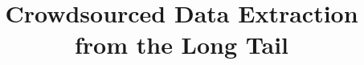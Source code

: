 \documentclass{sig-alternate}
\begin{document}

\title{Crowdsourced Data Extraction from the Long Tail}


\maketitle

%
\end{document}
